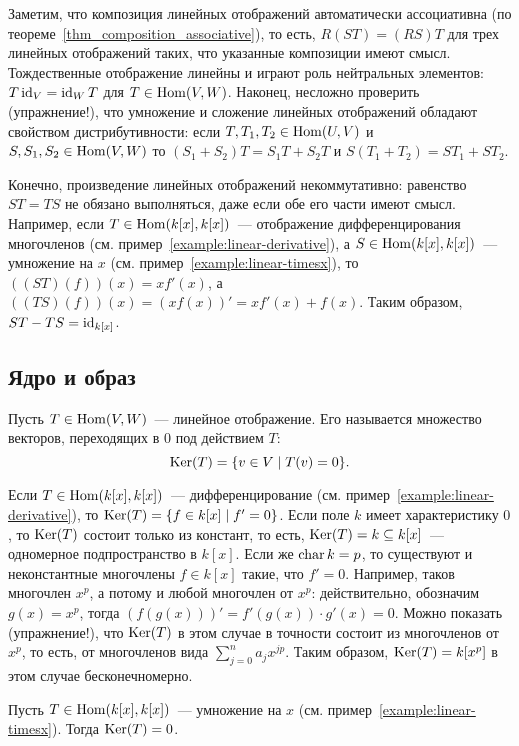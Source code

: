 Заметим, что композиция линейных отображений автоматически
ассоциативна (по теореме~\ref{thm_composition_associative}),
то есть, $R(ST) = (RS)T$ для трех линейных отображений таких,
что указанные композиции имеют смысл.
Тождественные отображение линейны и играют роль нейтральных
элементов: $T\operatorname{id}_V = \operatorname{id}_W T$ для $T\in\operatorname{Hom}(V,W)$.
Наконец, несложно проверить (упражнение!), что
умножение и сложение линейных отображений обладают свойством
дистрибутивности: если $T,T_1,T_2\in\operatorname{Hom}(U,V)$
и $S,S_1,S_2\in\operatorname{Hom}(V,W)$
то $(S_1+S_2)T = S_1T + S_2T$ и $S(T_1+T_2) = ST_1 + ST_2$.

Конечно, произведение линейных отображений некоммутативно:
равенство $ST=TS$ не обязано выполняться, даже если обе его
части имеют смысл. Например, если $T\in\operatorname{Hom}(k[x],k[x])$~---
отображение дифференцирования многочленов
(см. пример~\ref{example:linear-derivative}),
а $S\in\operatorname{Hom}(k[x],k[x])$~--- умножение на $x$
(см. пример~\ref{example:linear-timesx}),
то $((ST)(f))(x) = xf'(x)$,
а $((TS)(f))(x) = (xf(x))' = xf'(x) + f(x)$.
Таким образом, $ST-TS = \operatorname{id}_{k[x]}$.

\subsection{Ядро и образ}


\begin{definition}
Пусть $T\in\operatorname{Hom}(V,W)$~--- линейное отображение. Его
 называется множество векторов, переходящих
в $0$ под действием $T$:
$$
\operatorname{Ker}(T) = \{v\in V\mid T(v) = 0\}.
$$
\end{definition}

\begin{example}
Если $T\in\operatorname{Hom}(k[x],k[x])$~--- дифференцирование
(см. пример~\ref{example:linear-derivative}), то
$\operatorname{Ker}(T) = \{f\in k[x] \mid f'=0\}$. Если поле $k$
имеет характеристику $0$, то $\operatorname{Ker}(T)$ состоит только из
констант, то есть, $\operatorname{Ker}(T) = k\subseteq k[x]$~--- одномерное
подпространство в $k[x]$. Если же
$\operatorname{char} k = p$, то существуют и неконстантные многочлены
$f\in k[x]$
такие, что $f'=0$. Например, таков многочлен $x^p$,
а потому и любой многочлен от $x^p$: действительно,
обозначим $g(x) = x^p$, тогда
$(f(g(x)))' = f'(g(x))\cdot g'(x) = 0$.
Можно показать (упражнение!),
что $\operatorname{Ker}(T)$ в этом случае в точности состоит
из многочленов от $x^p$, то есть, от многочленов вида
$\sum_{j=0}^n a_j x^{jp}$. Таким образом,
$\operatorname{Ker}(T) = k[x^p]$ в этом случае бесконечномерно.
\end{example}
\begin{example}
Пусть $T\in\operatorname{Hom}(k[x],k[x])$~--- умножение на $x$
(см. пример~\ref{example:linear-timesx}).
Тогда $\operatorname{Ker}(T) = 0$.
\end{example}

